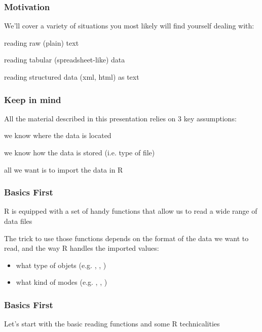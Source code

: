 \documentclass[12pt]{beamer}\usepackage[]{graphicx}\usepackage[]{color}
\begin{document}

\begin{frame}
\frametitle{Motivation}

We'll cover a variety of situations you most likely will find yourself dealing with:
\bbi
 \item reading raw (plain) text
 \item reading tabular (spreadsheet-like) data
 \item reading structured data (xml, html) as text
\ei

\end{frame}


\begin{frame}
\frametitle{Keep in mind}

All the material described in this presentation relies on 3 key assumptions:  
\bi
 \item we know {\hilit where} the data is located
 \item we know {\hilit how} the data is stored (i.e. type of file)
 \item all we want is to import the data in R
\ei

\end{frame}


\begin{frame}
\frametitle{Basics First}

R is equipped with a set of handy functions that allow us to read a wide range of data files

\bigskip

The trick to use those functions depends on the format of the data we want to read, and the way R handles the imported values:
\begin{itemize}
 \item what type of objets (e.g. , , )
 \item what kind of modes (e.g. , , )
\end{itemize}

\end{frame}


\begin{frame}
\frametitle{Basics First}

Let's start with the basic reading functions and some R technicalities
 \bi
  \item {\hilit {}}
  \item {\hilit {}}
  \item {\hilit {}}
 \ei
\eb

\end{frame}
\end{document}
